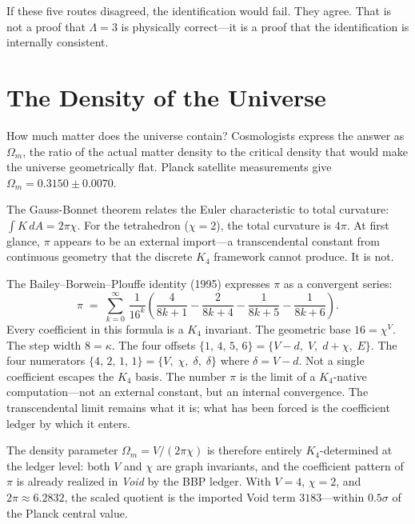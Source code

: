 \documentclass[11pt,a4paper]{book}
\begin{document}
If these five routes disagreed, the identification would fail. They agree. That is not a proof that $\Lambda = 3$ is physically correct---it is a proof that the identification is internally consistent.

\chapter{The Density of the Universe}
\label{ch:density-parameter}

How much matter does the universe contain? Cosmologists express the answer as $\Omega_m$, the ratio of the actual matter density to the critical density that would make the universe geometrically flat. Planck satellite measurements give $\Omega_m = 0.3150 \pm 0.0070$.

The Gauss-Bonnet theorem relates the Euler characteristic to total curvature: $\int K\,dA = 2\pi\chi$. For the tetrahedron ($\chi = 2$), the total curvature is $4\pi$. At first glance, $\pi$ appears to be an external import---a transcendental constant from continuous geometry that the discrete $K_4$ framework cannot produce. It is not.

The Bailey--Borwein--Plouffe identity (1995) expresses $\pi$ as a convergent series:
\[
  \pi \;=\; \sum_{k=0}^{\infty}\, \frac{1}{16^k}\!\left(\frac{4}{8k+1} - \frac{2}{8k+4} - \frac{1}{8k+5} - \frac{1}{8k+6}\right).
\]
Every coefficient in this formula is a $K_4$ invariant. The geometric base $16 = \chi^V$. The step width $8 = \kappa$. The four offsets $\{1,\, 4,\, 5,\, 6\} = \{V{-}d,\; V,\; d{+}\chi,\; E\}$. The four numerators $\{4,\, 2,\, 1,\, 1\} = \{V,\; \chi,\; \delta,\; \delta\}$ where $\delta = V - d$. Not a single coefficient escapes the $K_4$ basis. The number $\pi$ is the limit of a $K_4$-native computation---not an external constant, but an internal convergence. The transcendental limit remains what it is; what has been forced is the coefficient ledger by which it enters.

The density parameter $\Omega_m = V / (2\pi\chi)$ is therefore entirely $K_4$-determined at the ledger level: both $V$ and $\chi$ are graph invariants, and the coefficient pattern of $\pi$ is already realized in \textit{Void} by the BBP ledger. With $V = 4$, $\chi = 2$, and $2\pi \approx 6.2832$, the scaled quotient is the imported Void term $3183$---within $0.5\sigma$ of the Planck central value.
\end{document}
